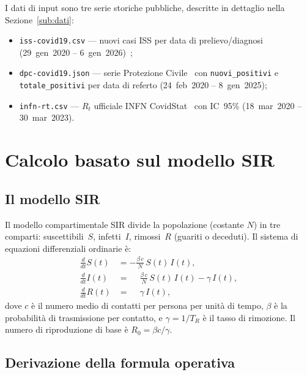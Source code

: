 \documentclass[12pt, a4paper]{article}
\begin{document}
I dati di input sono tre serie storiche pubbliche, descritte in dettaglio
nella Sezione~\ref{sub:dati}:
\begin{itemize}
    \item \texttt{iss-covid19.csv} — nuovi casi ISS per data di prelievo/diagnosi
          (29~gen~2020 -- 6~gen~2026)~\cite{ISS_opendata};
    \item \texttt{dpc-covid19.json} — serie Protezione Civile~\cite{DPC_github}
          con \texttt{nuovi\_positivi} e \texttt{totale\_positivi} per data di referto
          (24~feb~2020 -- 8~gen~2025);
    \item \texttt{infn-rt.csv} — $R_t$ ufficiale INFN CovidStat~\cite{INFN_rt}
          con IC~95\% (18~mar~2020 -- 30~mar~2023).
\end{itemize}

\section{Calcolo basato sul modello SIR}
\label{sec:sir}

\subsection{Il modello SIR}

Il modello compartimentale SIR divide la popolazione (costante $N$) in tre comparti:
suscettibili~$S$, infetti~$I$, rimossi~$R$ (guariti o deceduti).
Il sistema di equazioni differenziali ordinarie è:
\begin{align}
    \frac{d}{dt}S(t) &= -\frac{\beta \, c}{N}\, S(t)\, I(t), \label{eq:dS}\\[4pt]
    \frac{d}{dt}I(t) &= \phantom{-}\frac{\beta \, c}{N}\, S(t)\, I(t) - \gamma\, I(t), \label{eq:dI}\\[4pt]
    \frac{d}{dt}R(t) &= \phantom{-}\gamma\, I(t), \label{eq:dR}
\end{align}
dove $c$ è il numero medio di contatti per persona per unità di tempo, $\beta$ è la probabilità di
trasmissione per contatto, e $\gamma = 1/T_R$ è il tasso di rimozione.
Il numero di riproduzione di base è $R_0 = \beta c / \gamma$.

\subsection{Derivazione della formula operativa}
\label{sub:derivazione}
\end{document}
